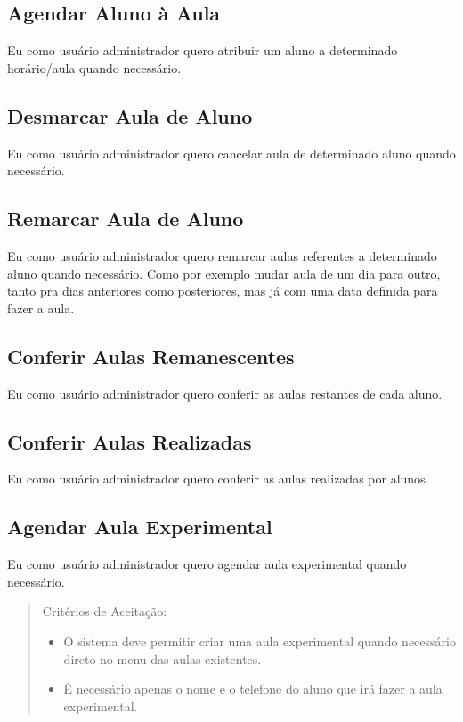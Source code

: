 \subsection[Agendar Aluno à Aula]{Agendar Aluno à Aula}
Eu como usuário administrador quero atribuir um aluno a determinado
horário/aula quando necessário.

\subsection[Desmarcar Aula de Aluno]{Desmarcar Aula de Aluno}
Eu como usuário administrador quero cancelar aula de determinado aluno quando
necessário.

\subsection[Remarcar Aula de Aluno]{Remarcar Aula de Aluno}
Eu como usuário administrador quero remarcar aulas referentes a determinado
aluno quando necessário. Como por exemplo mudar aula de um dia para outro,
tanto pra dias anteriores como posteriores, mas já com uma data definida
para fazer a aula.

\subsection[Conferir Aulas Remanescentes]{Conferir Aulas Remanescentes}
Eu como usuário administrador quero conferir as aulas restantes de cada aluno.

\subsection[Conferir Aulas Realizadas]{Conferir Aulas Realizadas}
Eu como usuário administrador quero conferir as aulas realizadas por alunos.

\subsection[Agendar Aula Experimental]{Agendar Aula Experimental}
Eu como usuário administrador quero agendar aula experimental quando necessário.

\begin{quote}
Critérios de Aceitação:
    \begin{itemize}
        \item O sistema deve permitir criar uma aula experimental quando necessário direto
        no menu das aulas existentes.
        \item É necessário apenas o nome e o telefone do aluno que irá fazer a aula
        experimental.
    \end{itemize}
\end{quote}

